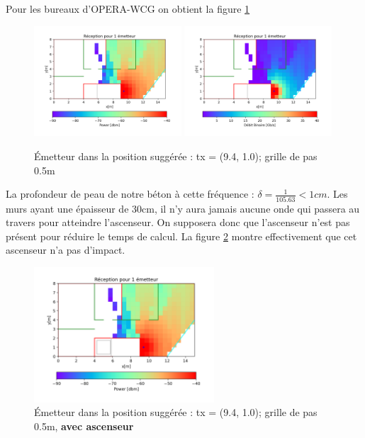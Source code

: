 \documentclass[sn-mathphys-num]{sn-jnl}
\begin{document}
Pour les bureaux d'OPERA-WCG on obtient la figure \ref{fig:base}
\begin{figure}[H]
    \centering
    \includegraphics[width=0.49\textwidth]{images/1_dbm_non_opti.png}
    \includegraphics[width=0.49\textwidth]{images/1_bin_non_opti.png}
    \caption{Émetteur dans la position suggérée : tx = (9.4, 1.0); grille de pas 0.5m}
    \label{fig:base}
\end{figure}

La profondeur de peau de notre béton à cette fréquence : $\delta = \frac{1}{105.63} < 1cm$.
Les murs ayant une épaisseur de 30cm, il n'y aura jamais aucune onde qui passera au travers
pour atteindre l'ascenseur.
On supposera donc que l'ascenseur n'est pas présent pour réduire le temps de calcul. 
La figure \ref{fig:elevator} montre effectivement que cet ascenseur n'a pas d'impact.

\begin{figure}[H]
    \centering
    \includegraphics[width=0.6\textwidth]{images/verif/elevator.png}
    \caption{Émetteur dans la position suggérée : tx = (9.4, 1.0); grille de pas 0.5m, \textbf{avec ascenseur}}
    \label{fig:elevator}
    
\end{figure}
\end{document}

